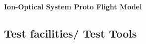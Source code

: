 		

		
		\textbf{Ion-Optical System Proto Flight Model}\\
		
	
	
	\subsection{Test facilities/ Test Tools}\label{subsec:setupTestTools} %
	
